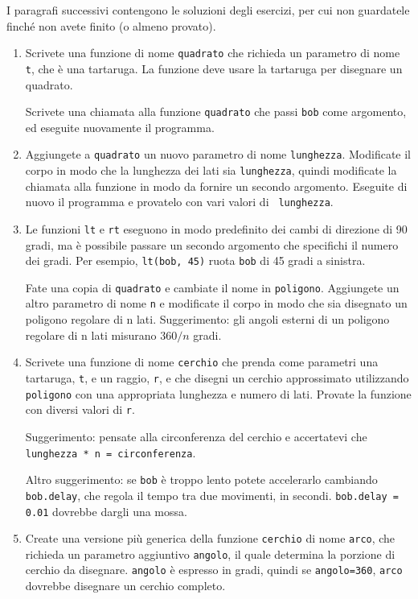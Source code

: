 \documentclass[10pt]{book}
\begin{document}
I paragrafi successivi contengono le soluzioni degli esercizi, per cui non guardatele finché non avete finito (o almeno provato).

\begin{enumerate}

\item Scrivete una funzione di nome {\tt quadrato} che richieda un parametro di nome {\tt t}, che è una tartaruga. La funzione deve usare la tartaruga per disegnare un quadrato.

Scrivete una chiamata alla funzione {\tt quadrato} che passi {\tt bob} come argomento, ed eseguite nuovamente il programma.

\item Aggiungete a {\tt quadrato} un nuovo parametro di nome {\tt lunghezza}.
Modificate il corpo in modo che la lunghezza dei lati sia {\tt lunghezza}, quindi modificate la chiamata alla funzione in modo da fornire un secondo argomento. Eseguite di nuovo il programma e provatelo con vari valori di {\tt
lunghezza}.

\item Le funzioni {\tt lt} e {\tt rt} eseguono in modo predefinito dei cambi di direzione di 90 gradi, ma è possibile passare un secondo argomento che specifichi il numero dei gradi. Per esempio, {\tt lt(bob, 45)} ruota {\tt bob} di 45 gradi a sinistra.

Fate una copia di {\tt quadrato} e cambiate il nome in {\tt poligono}.  Aggiungete un altro parametro di nome {\tt n} e modificate il corpo in modo che sia disegnato un poligono regolare di n lati. Suggerimento: gli angoli esterni di un poligono regolare di n lati misurano $360/n$ gradi.

\item Scrivete una funzione di nome {\tt cerchio} che prenda come parametri una tartaruga, {\tt t}, e un raggio, {\tt r}, e che disegni un cerchio approssimato utilizzando {\tt poligono} con una appropriata lunghezza e numero di lati. Provate la funzione con diversi valori di {\tt r}.

Suggerimento: pensate alla circonferenza del cerchio e accertatevi che
{\tt lunghezza * n = circonferenza}.

Altro suggerimento: se {\tt bob} è troppo lento potete accelerarlo cambiando {\tt bob.delay}, che regola il tempo tra due movimenti, in secondi.  {\tt bob.delay = 0.01} dovrebbe dargli una mossa.


\item Create una versione più generica della funzione {\tt cerchio} di nome {\tt arco}, che richieda un parametro aggiuntivo {\tt angolo}, il quale determina la porzione di cerchio da disegnare.  {\tt angolo} è espresso in gradi, quindi se {\tt angolo=360}, {\tt arco} dovrebbe disegnare un cerchio completo.

\end{enumerate}
\end{document}
